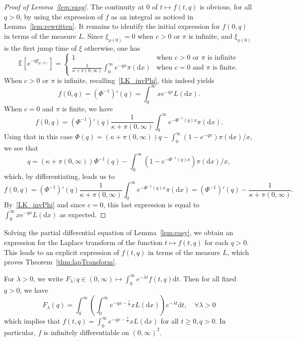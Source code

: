 \documentclass[AHL,Unicode,longabstracts,published]{cedram}
\newcommand{\bbE}{\mathbb{E}}
\newcommand{\dd}{\mathrm{d}}
\let\oldforall\forall
\renewcommand*{\forall}{\mathrel{\oldforall}}
\begin{document}
\begin{proof}[Proof of Lemma~\ref{lem:easy}]
The continuity at 0 of $t \mapsto f(t,q)$ is obvious, for all $q>0$, by using the expression of $f$ as an integral as noticed in Lemma~\ref{lem:rewritten}. It remains to identify the initial expression for $f(0,q)$ in terms of the measure $L$. Since $\xi_{\rho(0)}=0$ when $c>0$ or $\pi$ is infinite, and $\xi_{\rho(0)}$ is the first jump time of $\xi$ otherwise, one has
\[
\bbE\left[e^{-q \xi_{\rho(0)}}\right]=\left\{
\begin{array}{ll} 1 & \text{when $c>0$ or $\pi$ is infinite}\\ \frac{1}{\kappa+\pi(0,\infty)}\int_0^{\infty}e^{-qx} \pi(\dd x) & \text{when $c=0$ and $\pi$ is finite.}
\end{array}\right.
\]
When $c>0$ or $\pi$ is infinite, recalling~\eqref{LK_invPhi}, this indeed yields
\[
f(0,q)=(\Phi^{-1})'(q)=\int_0^{\infty} xe^{-qx} L(\dd x).
\]
When $c=0$ and $\pi$ is finite, we have
\[
f(0,q)=(\Phi^{-1})'(q) \frac{1}{\kappa+\pi(0,\infty)}\int_0^{\infty}e^{-\Phi^{-1}(q)x} \pi(\dd x).
\]
Using that in this case $\Phi(q)=(\kappa+\pi(0,\infty))q-\int_0^{\infty}(1-e^{-qx})\pi(\dd x)/x$, we see that
\[
q=(\kappa+\pi(0,\infty))\Phi^{-1}(q)-\int_0^{\infty}\left(1-e^{-\Phi^{-1}(q)x}\right)\pi(\dd x)/x,
\]
which, by differentiating, leads us to
\[
f(0,q)=(\Phi^{-1})'(q) \frac{1}{\kappa+\pi(0,\infty)}\int_0^{\infty}e^{-\Phi^{-1}(q)x} \pi(\dd x)=(\Phi^{-1})'(q) -\frac{1}{\kappa+\pi(0,\infty)}.
\]
By~\eqref{LK_invPhi} and since $c=0$, this last expression is equal to $\int_0^{\infty} xe^{-qx} L(\dd x)$ as expected.
\end{proof}


Solving the partial differential equation of Lemma~\ref{lem:easy}, we obtain an expression for the Laplace transform of the function $t \mapsto f(t,q)$ for each $q > 0$. This leads to an explicit expression of $f(t,q)$ in terms of the measure $L$, which proves Theorem~\ref{thm:lapTransform}.

\begin{lemm}\label{lem:laplaceLaplace}
For $\lambda>0$, we write $F_{\lambda} : q \in (0,\infty)\mapsto \int_0^{\infty} e^{-\lambda t} f(t,q) \dd t$. Then for all fixed $q>0$, we have
\begin{equation}\label{eq:Laplace}
F_{\lambda}(q)=\int_0^{\infty} \left(\int_0^{\infty} e^{-qx -\frac{t}{x}} xL(\dd x)\right) e^{-\lambda t} \dd t, \quad \forall \lambda>0
\end{equation}
which implies that $f(t,q)= \int_0^{\infty} e^{-qx -\frac{t}{x}} xL(\dd x)$ for all $t \geq 0, q>0$. In particular, $f$ is infinitely differentiable on $(0,\infty)^2$.
\end{lemm}
\end{document}
